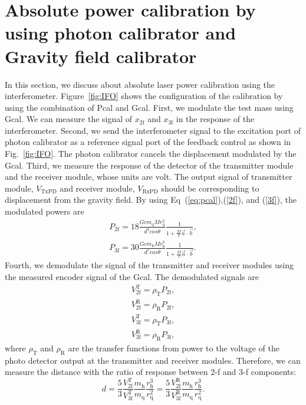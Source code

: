 \documentclass[A4]{spie}  %
\begin{document}
\section{Absolute power calibration by using photon calibrator and Gravity field calibrator} \label{sec:PGCAL}
In this section, we discuss about absolute laser power calibration using the interferometer. 
Figure~\ref{fig:IFO} shows the configuration of the calibration by using the combination of Pcal and Gcal.
First, we modulate the test mass using Gcal. We can measure the signal of $x_{\mathrm{2f}}$ and $x_{\mathrm{3f}}$ in the response of the interferometer. Second, we send the interferometer signal to the excitation port of photon calibrator as a reference signal port of the feedback control as shown in Fig.~\ref{fig:IFO}. The photon calibrator cancels the displacement modulated by the Gcal. Third, we measure the response of the detector of the transmitter module and the receiver module, whose units are volt. The output signal of transmitter module, $V_{\mathrm{TxPD}}$ and receiver module, $V_{\mathrm{RxPD}}$ should be corresponding to displacement from the gravity field. By using Eq~(\ref{eq:pcal}),(\ref{2f}), and (\ref{3f}), the modulated powers are
\begin{eqnarray}
 P_{\mathrm{2f}}=18 \frac{Gcm_{\mathrm{q}}Mr_{\mathrm{q}}^2}{d^4cos\theta}\frac{1}{1+\frac{M}{I}\vec{a}\cdot \vec{b}}, \label{P2f} \\
 P_{\mathrm{3f}}= 30\frac{Gcm_{\mathrm{h}}Mr_{\mathrm{h}}^3}{d^5cos\theta}\frac{1}{1+\frac{M}{I}\vec{a}\cdot \vec{b}}. \label{P3f}
\end{eqnarray}
Fourth, we demodulate the signal of the transmitter and receiver modules using the measured encoder signal of the Gcal.
The demodulated signals are 
\begin{eqnarray}
V_{\mathrm{2f}}^{\mathrm{T}}=\rho_{\mathrm{T}}P_{\mathrm{2f}}, \\
V_{\mathrm{2f}}^{\mathrm{R}}=\rho_{\mathrm{R}}P_{\mathrm{2f}}, \\
V_{\mathrm{3f}}^{\mathrm{T}}=\rho_{\mathrm{T}}P_{\mathrm{3f}}, \\
V_{\mathrm{3f}}^{\mathrm{R}}=\rho_{\mathrm{R}}P_{\mathrm{3f}}, 
\end{eqnarray} 
where $\rho_{\mathrm{T}}$ and $\rho_{\mathrm{R}}$ are the transfer functions from power to the voltage of the photo detector output at the transmitter and receiver modules.
Therefore, we can measure the distance with the ratio of response between 2-f and 3-f components: 
\begin{equation}
d=\frac{5}{3} \frac{V_{\mathrm{2f}}^{\mathrm{T}}}{V_{\mathrm{3f}}^{\mathrm{T}}}\frac{m_{\mathrm{h}}}{m_{\mathrm{q}}}\frac{r_{\mathrm{h}}^{3}}{r_{\mathrm{q}}^{2}}=\frac{5}{3} \frac{V_{\mathrm{2f}}^{\mathrm{R}}}{V_{\mathrm{3f}}^{\mathrm{R}}} \frac{m_{\mathrm{h}}}{m_{\mathrm{q}}}\frac{r_{\mathrm{h}}^{3}}{r_{\mathrm{q}}^{2}}. \label{d}
\end{equation}
\end{document}
